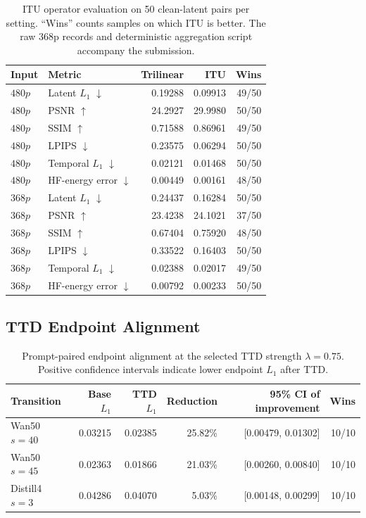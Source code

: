\documentclass[letterpaper]{article}
\begin{document}
\begin{table}[t]
  \centering
  \small
  \setlength{\tabcolsep}{3.2pt}
  \begin{tabular}{llrrr}
    \toprule
    Input & Metric & Trilinear & ITU & Wins \\
    \midrule
    \(480p\) & Latent \(L_1\) \(\downarrow\) & 0.19288 & 0.09913 & 49/50 \\
    \(480p\) & PSNR \(\uparrow\) & 24.2927 & 29.9980 & 50/50 \\
    \(480p\) & SSIM \(\uparrow\) & 0.71588 & 0.86961 & 49/50 \\
    \(480p\) & LPIPS \(\downarrow\) & 0.23575 & 0.06294 & 50/50 \\
    \(480p\) & Temporal \(L_1\) \(\downarrow\) & 0.02121 & 0.01468 & 50/50 \\
    \(480p\) & HF-energy error \(\downarrow\) & 0.00449 & 0.00161 & 48/50 \\
    \midrule
    \(368p\) & Latent \(L_1\) \(\downarrow\) & 0.24437 & 0.16284 & 50/50 \\
    \(368p\) & PSNR \(\uparrow\) & 23.4238 & 24.1021 & 37/50 \\
    \(368p\) & SSIM \(\uparrow\) & 0.67404 & 0.75920 & 48/50 \\
    \(368p\) & LPIPS \(\downarrow\) & 0.33522 & 0.16403 & 50/50 \\
    \(368p\) & Temporal \(L_1\) \(\downarrow\) & 0.02388 & 0.02017 & 49/50 \\
    \(368p\) & HF-energy error \(\downarrow\) & 0.00792 & 0.00233 & 50/50 \\
    \bottomrule
  \end{tabular}
  \caption{ITU operator evaluation on 50 clean-latent pairs per setting.
  ``Wins'' counts samples on which ITU is better.  The raw 368p records and
  deterministic aggregation script accompany the submission.}
  \label{tab:itu-operator}
\end{table}

\subsection{TTD Endpoint Alignment}

\begin{table}[t]
  \centering
  \small
  \setlength{\tabcolsep}{4pt}
  \begin{tabular}{lrrrrr}
    \toprule
    Transition & Base \(L_1\) & TTD \(L_1\) & Reduction &
    95\% CI of improvement & Wins \\
    \midrule
    Wan50 \(s=40\) & 0.03215 & 0.02385 & 25.82\% &
    [0.00479, 0.01302] & 10/10 \\
    Wan50 \(s=45\) & 0.02363 & 0.01866 & 21.03\% &
    [0.00260, 0.00840] & 10/10 \\
    Distill4 \(s=3\) & 0.04286 & 0.04070 & 5.03\% &
    [0.00148, 0.00299] & 10/10 \\
    \bottomrule
  \end{tabular}
  \caption{Prompt-paired endpoint alignment at the selected TTD strength
  \(\lambda=0.75\).  Positive confidence intervals indicate lower endpoint
  \(L_1\) after TTD.}
  \label{tab:ttd-endpoint}
\end{table}
\end{document}
